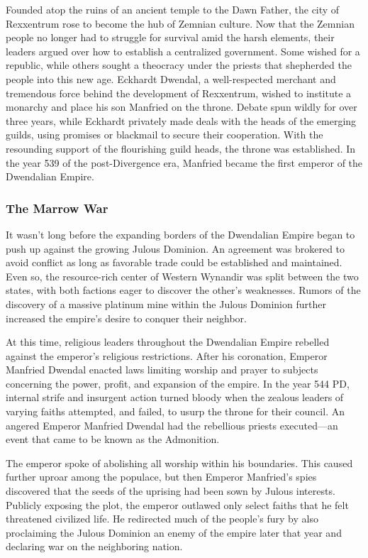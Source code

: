 \documentclass[10pt,a4paper,twoside,bg=print,twocolumn,openany,nodeprecatedcode]{dndbook}
\begin{document}
Founded atop the ruins of an ancient temple to the Dawn Father, the city of Rexxentrum rose to become the hub of Zemnian culture. Now that the Zemnian people no longer had to struggle for survival amid the harsh elements, their leaders argued over how to establish a centralized government. Some wished for a republic, while others sought a theocracy under the priests that shepherded the people into this new age. Eckhardt Dwendal, a well-respected merchant and tremendous force behind the development of Rexxentrum, wished to institute a monarchy and place his son Manfried on the throne. Debate spun wildly for over three years, while Eckhardt privately made deals with the heads of the emerging guilds, using promises or blackmail to secure their cooperation. With the resounding support of the flourishing guild heads, the throne was established. In the year 539 of the post-Divergence era, Manfried became the first emperor of the Dwendalian Empire.

\subsubsection{The Marrow War}
It wasn't long before the expanding borders of the Dwendalian Empire began to push up against the growing Julous Dominion. An agreement was brokered to avoid conflict as long as favorable trade could be established and maintained. Even so, the resource-rich center of Western Wynandir was split between the two states, with both factions eager to discover the other's weaknesses. Rumors of the discovery of a massive platinum mine within the Julous Dominion further increased the empire's desire to conquer their neighbor.

At this time, religious leaders throughout the Dwendalian Empire rebelled against the emperor's religious restrictions. After his coronation, Emperor Manfried Dwendal enacted laws limiting worship and prayer to subjects concerning the power, profit, and expansion of the empire. In the year 544 PD, internal strife and insurgent action turned bloody when the zealous leaders of varying faiths attempted, and failed, to usurp the throne for their council. An angered Emperor Manfried Dwendal had the rebellious priests executed—an event that came to be known as the Admonition.

The emperor spoke of abolishing all worship within his boundaries. This caused further uproar among the populace, but then Emperor Manfried's spies discovered that the seeds of the uprising had been sown by Julous interests. Publicly exposing the plot, the emperor outlawed only select faiths that he felt threatened civilized life. He redirected much of the people's fury by also proclaiming the Julous Dominion an enemy of the empire later that year and declaring war on the neighboring nation.
\end{document}
